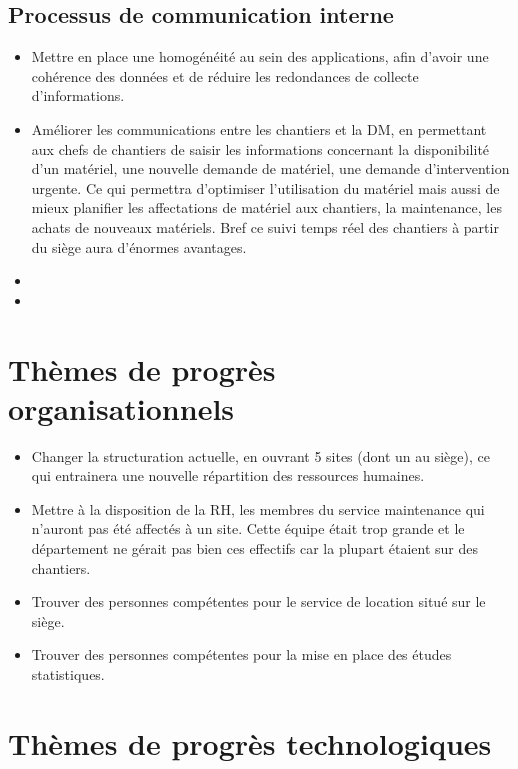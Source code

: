         \subsection{Processus de communication interne}
        \begin{itemize}
                \item Mettre en place une homogénéité au sein des applications, afin d'avoir une cohérence des données et de réduire les redondances de collecte d'informations.
                \item Améliorer les communications entre les chantiers et la DM, en permettant aux chefs de chantiers de saisir les informations concernant la disponibilité d'un matériel, une nouvelle demande de matériel, une demande d'intervention urgente. Ce qui permettra d'optimiser l'utilisation du matériel mais aussi de mieux planifier les affectations de matériel aux chantiers, la maintenance, les achats de nouveaux matériels. Bref ce suivi temps réel des chantiers à partir du siège aura d'énormes avantages.
                \item 
                \item 
        \end{itemize}

\section{Thèmes de progrès organisationnels}
        \begin{itemize}
                \item Changer la structuration actuelle, en ouvrant 5 sites (dont un au siège), ce qui entrainera une nouvelle répartition des ressources humaines.
                \item Mettre à la disposition de la RH, les membres du service maintenance qui n'auront pas été affectés à un site. Cette équipe était trop grande et le département ne gérait pas bien ces effectifs car la plupart étaient sur des chantiers.
                \item Trouver des personnes compétentes pour le service de location situé sur le siège.
                \item Trouver des personnes compétentes pour la mise en place des études statistiques.
        \end{itemize}

\section{Thèmes de progrès technologiques}

